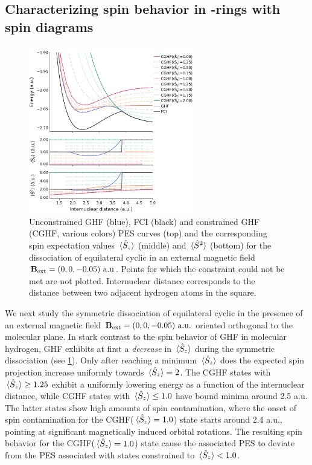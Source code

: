 \documentclass[journal=jctc,manuscript=article]{achemso}
\begin{document}
    \subsection{Characterizing spin behavior in -rings with spin diagrams}

        \begin{figure}
            \centering
            \includegraphics[width=0.65\textwidth]{C-GHF-PES(H4)(med-B)}
            \caption{
                Unconstrained GHF (blue), FCI (black) and constrained GHF (CGHF, various colors) PES curves (top) and the corresponding spin expectation values $\ev*{\hat{S}_z}$ (middle) and $\ev*{\hat{S}^2}$ (bottom) for the dissociation of equilateral cyclic  in an external magnetic field $\vb{B}_{\text{ext}} = (0,0,-0.05)\text{ a.u}$.
                Points for which the constraint could not be met are not plotted. Internuclear distance corresponds to the distance between two adjacent hydrogen atoms in the  square.                 
            }
            \label{fig:C-GHF-PES(H4)(med-B)}
        \end{figure}   

        We next study the symmetric dissociation of equilateral cyclic  in the presence of an external magnetic field $\vb{B}_{\text{ext}} = (0,0,-0.05)\text{ a.u.}$ oriented orthogonal to the molecular plane. In stark contrast to the spin behavior of GHF in molecular hydrogen, GHF exhibits at first a \emph{decrease} in $\ev*{\hat{S}_z}$ during the symmetric dissociation (see \cref{fig:C-GHF-PES(H4)(med-B)}). 
        Only after reaching a minimum $\ev*{\hat{S}_z}$ does the expected spin projection increase uniformly towards $\ev*{\hat{S}_z} = 2$.
        The CGHF states with $\ev*{\hat{S}_z} \geq 1.25$ exhibit a uniformly lowering energy as a function of the internuclear distance, while CGHF states with $\ev*{\hat{S}_z} \leq 1.0$ have bound minima around 2.5 a.u.
        The latter states show high amounts of spin contamination, where the onset of spin contamination for the CGHF($\ev*{\hat{S}_z}=1.0$) state starts around 2.4 a.u., pointing at significant magnetically induced orbital rotations.
        The resulting spin behavior for the CGHF($\ev*{\hat{S}_z}=1.0$) state  cause the associated PES to deviate from the PES associated with states constrained to $\ev*{\hat{S}_z} < 1.0$.
        
\end{document}
